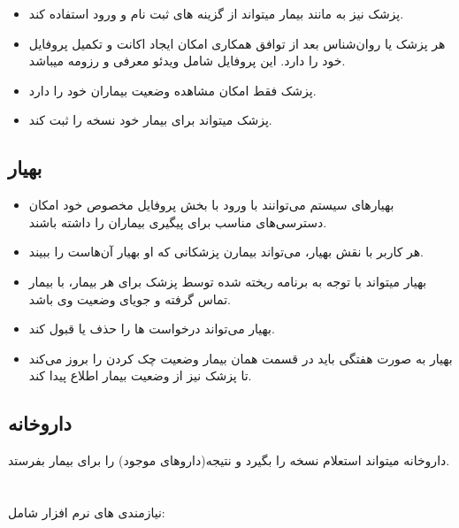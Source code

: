 \documentclass[a4paper]{article}
\begin{document}
		\begin{itemize}
			
		\item پزشک نیز به مانند بیمار میتواند از گزینه های ثبت نام و ورود استفاده کند.   	 
		\item هر پزشک یا روان‌شناس بعد از توافق همکاری امکان ایجاد اکانت و تکمیل پروفایل خود را دارد. این پروفایل شامل ویدئو معرفی و رزومه میباشد.
		\item پزشک فقط امکان مشاهده وضعیت بیماران خود را دارد.
		\item پزشک میتواند برای بیمار خود نسخه را ثبت کند.
		
		\end{itemize}
	
		\subsection{بهیار}
		
		\begin{itemize}
			
		\item بهیار‌های سیستم می‌توانند با ورود با بخش پروفایل مخصوص خود امکان دسترسی‌های مناسب برای پیگیری بیماران را داشته باشند.
		\item هر کاربر با نقش بهیار، می‌تواند بیمارن پزشکانی که او بهیار آن‌هاست را ببیند.
		\item بهیار میتواند با توجه به برنامه ریخته شده توسط پزشک برای هر بیمار، با بیمار تماس گرفته و جویای وضعیت وی باشد.
		\item بهیار می‌تواند درخواست ها را حذف یا قبول کند.
		\item بهیار به صورت هفتگی باید در قسمت همان بیمار وضعیت چک کردن را بروز می‌کند تا پزشک نیز از وضعیت بیمار اطلاع پیدا کند.
				
		\end{itemize}
		
		\subsection{داروخانه}
		داروخانه میتواند استعلام نسخه را بگیرد و نتیجه(داروهای موجود) را برای بیمار بفرستد.
	\section{}
	نیازمندی های  نرم افزار شامل:
	
\end{document}
